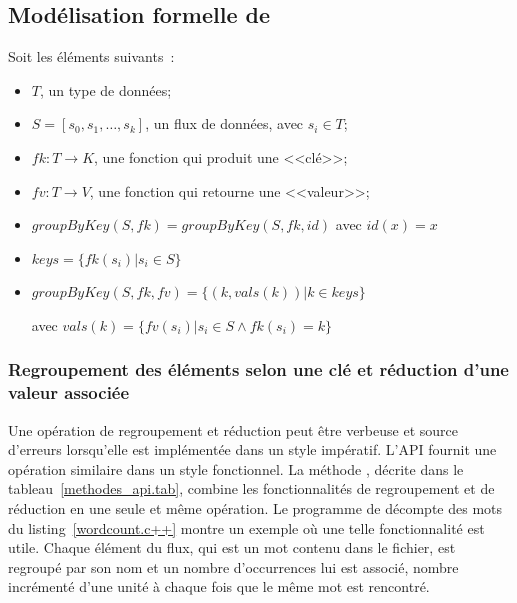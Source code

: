 \subsection*{Mod\'elisation formelle de }

Soit les \'el\'ements suivants~: 
\begin{itemize}
\item $T$, un type de donn\'ees;

\item $S = [s_0, s_1, \ldots, s_k]$, un flux de donn\'ees, avec $s_i
\in T$; 

\item $fk: T \rightarrow K$, une fonction qui produit une <<cl\'e>>;

\item $fv: T \rightarrow V$, une fonction qui retourne une
<<valeur>>;


\end{itemize}


\begin{itemize}
\item $groupByKey(S, fk) = groupByKey(S, fk, id)$ avec $id(x) = x$
\end{itemize}

\begin{itemize}
\item $keys = \{ fk(s_i) \vert s_i \in S \}$

\item $groupByKey(S, fk, fv) = \{ (k, vals(k)) \vert k \in keys\}$


avec $vals(k) = \{ fv(s_i) \vert  s_i\in S \wedge fk(s_i) = k\}$

\end{itemize}






\subsubsection{Regroupement des \'el\'ements selon une cl\'e et r\'eduction d'une valeur associ\'ee}

Une op\'eration de regroupement et r\'eduction peut \^etre verbeuse et source d'erreurs lorsqu'elle est impl\'ement\'ee dans un style imp\'eratif. L'{API} fournit une op\'eration similaire dans un style fonctionnel. La m\'ethode , d\'ecrite dans le tableau~\ref{methodes_api.tab}, combine les fonctionnalit\'es de regroupement et de r\'eduction en une seule et m\^eme op\'eration. Le programme de d\'ecompte des mots du listing~\ref{wordcount.c++} montre un exemple o\`u une telle fonctionnalit\'e est utile. Chaque \'el\'ement du flux, qui est un mot contenu dans le fichier, est regroup\'e par son nom et un nombre d'occurrences lui est associ\'e, nombre incr\'ement\'e d'une unit\'e \`a chaque fois que le m\^eme mot est rencontr\'e.

